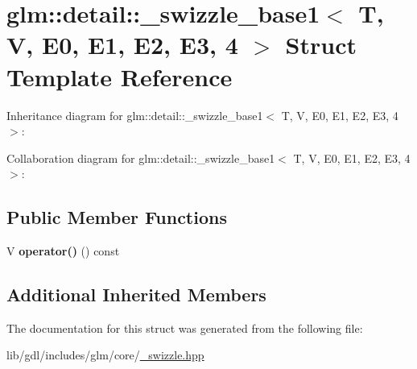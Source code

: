 \hypertarget{structglm_1_1detail_1_1__swizzle__base1_3_01_t_00_01_v_00_01_e0_00_01_e1_00_01_e2_00_01_e3_00_014_01_4}{}\section{glm\+:\+:detail\+:\+:\+\_\+swizzle\+\_\+base1$<$ T, V, E0, E1, E2, E3, 4 $>$ Struct Template Reference}
\label{structglm_1_1detail_1_1__swizzle__base1_3_01_t_00_01_v_00_01_e0_00_01_e1_00_01_e2_00_01_e3_00_014_01_4}


Inheritance diagram for glm\+:\+:detail\+:\+:\+\_\+swizzle\+\_\+base1$<$ T, V, E0, E1, E2, E3, 4 $>$\+:


Collaboration diagram for glm\+:\+:detail\+:\+:\+\_\+swizzle\+\_\+base1$<$ T, V, E0, E1, E2, E3, 4 $>$\+:
\subsection*{Public Member Functions}
\begin{DoxyCompactItemize}
\item 
\hypertarget{structglm_1_1detail_1_1__swizzle__base1_3_01_t_00_01_v_00_01_e0_00_01_e1_00_01_e2_00_01_e3_00_014_01_4_acca1ce42f230b5adba6b01b77af5f61a}{}V {\bfseries operator()} () const \label{structglm_1_1detail_1_1__swizzle__base1_3_01_t_00_01_v_00_01_e0_00_01_e1_00_01_e2_00_01_e3_00_014_01_4_acca1ce42f230b5adba6b01b77af5f61a}

\end{DoxyCompactItemize}
\subsection*{Additional Inherited Members}


The documentation for this struct was generated from the following file\+:\begin{DoxyCompactItemize}
\item 
lib/gdl/includes/glm/core/\hyperlink{__swizzle_8hpp}{\+\_\+swizzle.\+hpp}\end{DoxyCompactItemize}

